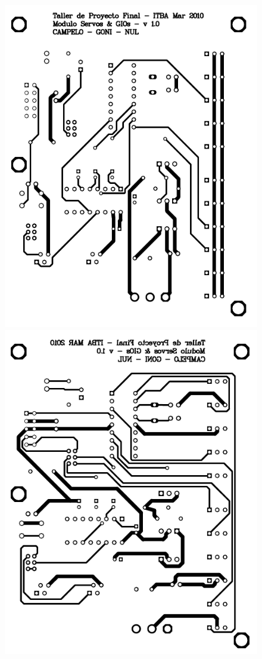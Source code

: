 \begin{figure}
	\centering
	\includegraphics[scale=.3]{figuras/servo_top.png}
	\includegraphics[scale=.3]{figuras/servo_bottom.png}

\end{figure}
